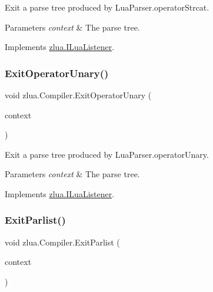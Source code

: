 Exit a parse tree produced by Lua\+Parser.\+operator\+Strcat. 


\begin{DoxyParams}{Parameters}
{\em context} & The parse tree.\\
\hline
\end{DoxyParams}


Implements \mbox{\hyperlink{interfacezlua_1_1_i_lua_listener_a9b0c6b0efb7d5c405477117f0df532fa}{zlua.\+I\+Lua\+Listener}}.

\mbox{\label{classzlua_1_1_compiler_a345eb068591d3ef3beddc652b206e53f}} 
\subsubsection{\texorpdfstring{Exit\+Operator\+Unary()}{ExitOperatorUnary()}}
{\footnotesize\ttfamily void zlua.\+Compiler.\+Exit\+Operator\+Unary (\begin{DoxyParamCaption}\item[{\mbox{[}\+Not\+Null\mbox{]} \mbox{\hyperlink{classzlua_1_1_lua_parser_1_1_operator_unary_context}{Lua\+Parser.\+Operator\+Unary\+Context}}}]{context }\end{DoxyParamCaption})}



Exit a parse tree produced by Lua\+Parser.\+operator\+Unary. 


\begin{DoxyParams}{Parameters}
{\em context} & The parse tree.\\
\hline
\end{DoxyParams}


Implements \mbox{\hyperlink{interfacezlua_1_1_i_lua_listener_ab4c9d1484b1f65d892ad588b7b01814e}{zlua.\+I\+Lua\+Listener}}.

\mbox{\label{classzlua_1_1_compiler_a90fc72d7a58e9c5d6386366362ceb0c8}} 
\subsubsection{\texorpdfstring{Exit\+Parlist()}{ExitParlist()}}
{\footnotesize\ttfamily void zlua.\+Compiler.\+Exit\+Parlist (\begin{DoxyParamCaption}\item[{\mbox{[}\+Not\+Null\mbox{]} \mbox{\hyperlink{classzlua_1_1_lua_parser_1_1_parlist_context}{Lua\+Parser.\+Parlist\+Context}}}]{context }\end{DoxyParamCaption})}



